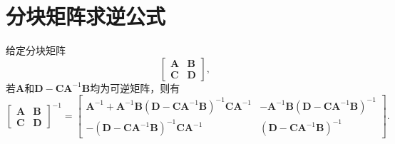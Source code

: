 \section{分块矩阵求逆公式}
\begin{theorem}\label{thm:block-matrix-inverse}
    给定分块矩阵
    \[
        \begin{bmatrix}
            \mathbf{A} & \mathbf{B} \\
            \mathbf{C} & \mathbf{D}
        \end{bmatrix},
    \]
    若\( \mathbf{A} \)和\( \mathbf{D} - \mathbf{C}\mathbf{A}^{-1}\mathbf{B} \)均为可逆矩阵，则有
    \[
        \begin{bmatrix}
            \mathbf{A} & \mathbf{B} \\
            \mathbf{C} & \mathbf{D}
        \end{bmatrix}^{-1} = \begin{bmatrix}
            \mathbf{A}^{-1} + \mathbf{A}^{-1}\mathbf{B}(\mathbf{D} - \mathbf{C}\mathbf{A}^{-1}\mathbf{B})^{-1}\mathbf{C}\mathbf{A}^{-1} & -\mathbf{A}^{-1}\mathbf{B}(\mathbf{D} - \mathbf{C}\mathbf{A}^{-1}\mathbf{B})^{-1} \\
            -(\mathbf{D} - \mathbf{C}\mathbf{A}^{-1}\mathbf{B})^{-1}\mathbf{C}\mathbf{A}^{-1}                                           & (\mathbf{D} - \mathbf{C}\mathbf{A}^{-1}\mathbf{B})^{-1}
        \end{bmatrix}.
    \]
\end{theorem}
